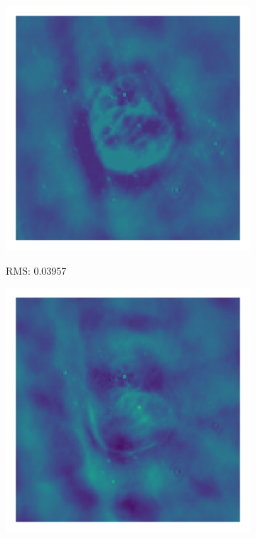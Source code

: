 \begin{figure}[h]
	\begin{subfigure}[b]{0.3\linewidth}
		\includegraphics[width=\linewidth, trim={18px 19px 18px 18px}, clip]{./chapters/05.results/g55/clean_residual.png}
		\begin{center}RMS: 0.03957\end{center}
	\end{subfigure}
	\begin{subfigure}[b]{0.3\linewidth}
		\includegraphics[width=\linewidth, trim={18px 19px 18px 18px}, clip]{./chapters/05.results/g55/positive_deconv_residual.png}

\end{subfigure}
\end{figure}
